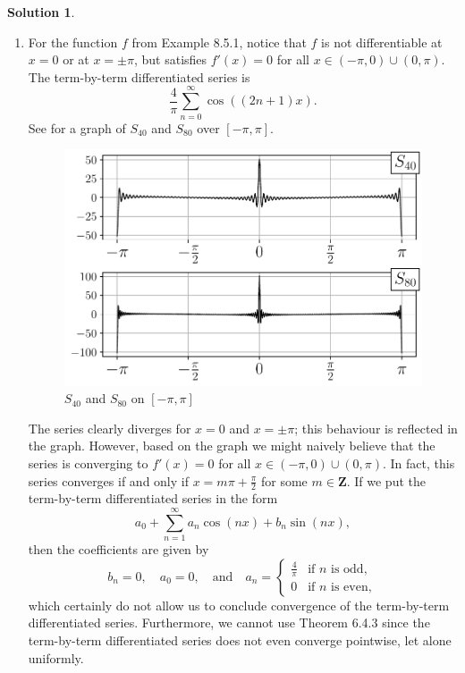 \documentclass[12pt]{article}
\theoremstyle{definition}
\theoremstyle{exercise}
\theoremstyle{solution}
\newtheorem*{solution}{Solution}
\newcommand{\quand}{\quad \text{and} \quad}
\newcommand{\Z}{\mathbf{Z}}
\begin{document}
\begin{solution}
\begin{enumerate}
        \item For the function \( f \) from Example 8.5.1, notice that \( f \) is not differentiable at \( x = 0 \) or at \( x = \pm \pi \), but satisfies \( f'(x) = 0 \) for all \( x \in (-\pi, 0) \cup (0, \pi) \). The term-by-term differentiated series is
        \[
            \frac{4}{\pi} \sum_{n=0}^{\infty} \cos((2n + 1)x).
        \]
        See  for a graph of \( S_{40} \) and \( S_{80} \) over \( [-\pi, \pi] \).
        \begin{figure}[H]
            \centering
            \includegraphics{UA_Section_8_5_Figure_2.pdf}
            \caption{\( S_{40} \) and \( S_{80} \) on \( [-\pi, \pi] \)}
            \label{fig:2}
        \end{figure}
        The series clearly diverges for \( x = 0 \) and \( x = \pm \pi \); this behaviour is reflected in the graph. However, based on the graph we might naively believe that the series is converging to \( f'(x) = 0 \) for all \( x \in (-\pi, 0) \cup (0, \pi) \). In fact, this series converges if and only if \( x = m \pi + \tfrac{\pi}{2} \) for some \( m \in \Z \). If we put the term-by-term differentiated series in the form
        \[
            a_0 + \sum_{n=1}^{\infty} a_n \cos(nx) + b_n \sin(nx),
        \]
        then the coefficients are given by
        \[
            b_n = 0, \quad a_0 = 0, \quand a_n = \begin{cases}
                \frac{4}{\pi} & \text{if } n \text{ is odd}, \\
                0 & \text{if } n \text{ is even},
            \end{cases}
        \]
        which certainly do not allow us to conclude convergence of the term-by-term differentiated series. Furthermore, we cannot use Theorem 6.4.3 since the term-by-term differentiated series does not even converge pointwise, let alone uniformly.


\end{enumerate}
\end{solution}
\end{document}
